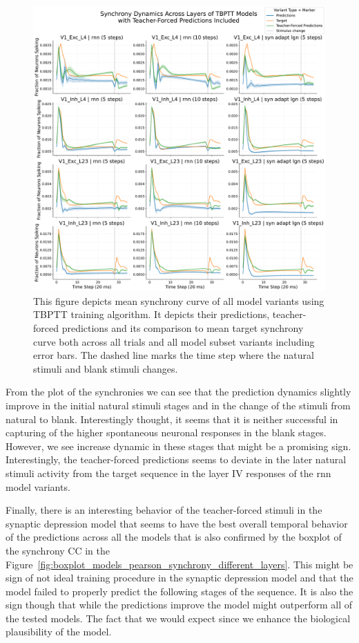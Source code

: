 \begin{figure}
    \centering
    \includegraphics[width=\linewidth]{img/plots/tbptt_models_forced_included_model_synchrony_curve.pdf}
    \caption{This figure depicts mean synchrony curve of all model variants using TBPTT training algorithm. It depicts their predictions, teacher-forced predictions and its comparison to mean target synchrony curve both across all trials and all model subset variants including error bars. The dashed line marks the time step where the natural stimuli and blank stimuli changes.}
    \label{fig:free_vs_teacher_forced_synchrony}
\end{figure}

From the plot of the synchronies we can see that the prediction dynamics slightly improve in the initial natural stimuli stages and in the change of the stimuli from natural to blank. Interestingly thought, it seems that it is neither successful in capturing of the higher spontaneous neuronal responses in the blank stages. However, we see increase dynamic in these stages that might be a promising sign. Interestingly, the teacher-forced predictions seems to deviate in the later natural stimuli activity from the target sequence in the layer IV responses of the rnn model variants. 

Finally, there is an interesting behavior of the teacher-forced stimuli in the synaptic depression model that seems to have the best overall temporal behavior of the predictions across all the models that is also confirmed by the boxplot of the synchrony CC in the Figure~\ref{fig:boxplot_models_pearson_synchrony_different_layers}. This might be sign of not ideal training procedure in the synaptic depression model and that the model failed to properly predict the following stages of the sequence. It is also the sign though that while the predictions improve the model might outperform all of the tested models. The fact that we would expect since we enhance the biological plausibility of the model.

